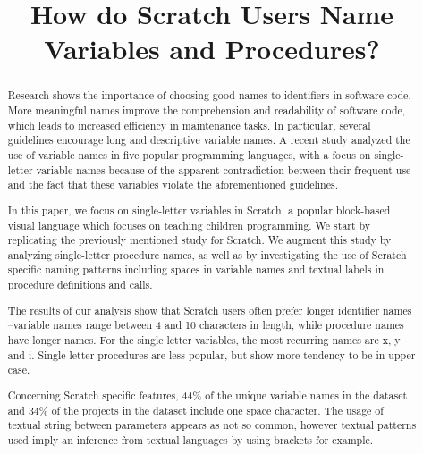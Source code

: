 \documentclass[conference]{IEEEtran}
\begin{document}
\title{How do Scratch Users Name Variables and Procedures? }

\author{
\and
{}
}
\maketitle

\begin{abstract}
Research shows the importance of choosing good names to identifiers in software code. More meaningful names improve the comprehension and readability of software code, which leads to increased efficiency in maintenance tasks. 
In particular, several guidelines encourage long and descriptive variable names.
A recent study analyzed the use of variable names in five popular programming languages, with a focus on single-letter variable names because of the apparent contradiction between their frequent use and the fact that these variables violate the aforementioned guidelines.

In this paper, we focus on single-letter variables in Scratch, a popular block-based visual language which focuses on teaching children programming. We start by replicating the previously mentioned study for Scratch. 
We augment this study by analyzing single-letter procedure names, as well as by investigating the use of Scratch specific naming patterns including spaces in variable names and textual labels in procedure definitions and calls.

The results of our analysis show that Scratch users often prefer longer identifier names --variable names range between 4 and 10 characters in length, while procedure names have longer names. For the single letter variables, the most recurring names are x, y and i. Single letter procedures are less popular, but show more tendency to be in upper case. 

Concerning Scratch specific features, 44\% of the unique variable names in the dataset and 34\% of the projects in the dataset include one space character. The usage of textual string between parameters appears as not so common, however textual patterns used imply an inference from textual languages by using brackets for example. 


\end{abstract}
\end{document}

